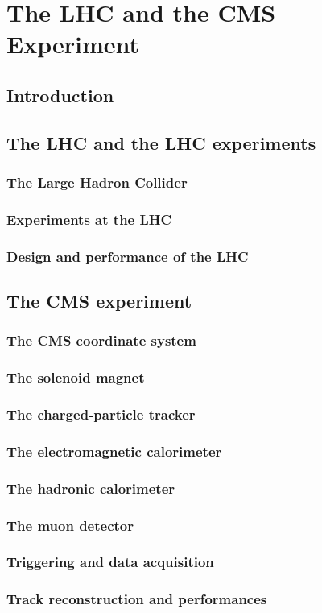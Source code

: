 
\chapter{The LHC and the CMS Experiment} %

\label{Chapter2} %


\section{Introduction}

\section{The LHC and the LHC experiments}
\subsection{The Large Hadron Collider}
\subsection{Experiments at the LHC}
\subsection{Design and performance of the LHC}

\section{The CMS experiment}
\subsection{The CMS coordinate system} 
\subsection{The solenoid magnet} 
\subsection{The charged-particle tracker} 
\subsection{The electromagnetic calorimeter} 
\subsection{The hadronic calorimeter} 
\subsection{The muon detector} 
\subsection{Triggering and data acquisition} 
\subsection{Track reconstruction and performances} 

\clearpage
